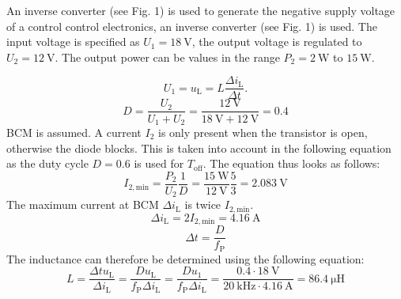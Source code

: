 

An inverse converter (see Fig. 1) is used to generate the negative supply voltage of a control control electronics, an inverse converter (see Fig. 1) is used. The input voltage is specified as $U_\mathrm{1}=\SI{18}{\volt}$, the output voltage is regulated to $U_\mathrm{2}=\SI{12}{\volt}$. The output power can be values in the range $P_\mathrm{2}=\SI{2}{\watt}$ to $\SI{15}{\watt}$.




\begin{solutionblock}
    \begin{equation}
        U_{\mathrm{1}} = u_{\mathrm{L}} = L \frac{\Delta i_{\mathrm{L}} }{\Delta t}. 
    \end{equation}
\begin{equation}
    D = \frac{U_\mathrm{2}}{U_\mathrm{1}+U_\mathrm{2}} = \frac{\SI{12}{\volt}}{\SI{18}{\volt}+\SI{12}{\volt}} = 0.4
\end{equation}
BCM is assumed. A current $I_\mathrm{2}$ is only present when the transistor is open, otherwise the diode blocks. This is taken into account in the following equation as the duty cycle $D = 0.6$ is used for $T_\mathrm{off}$. The equation thus looks as follows:
\begin{equation}
    I_\mathrm{2,min} = \frac{P_\mathrm{2}}{U_\mathrm{2}} \frac{1}{D}=\frac{\SI{15}{\watt}}{\SI{12}{\volt}}\frac{5}{3}=\SI{2.083}{\volt}
\end{equation}
The maximum current at BCM $\Delta i_{\mathrm{L}}$ is twice  $I_\mathrm{2,min}$.
\begin{equation}
    \Delta i_{\mathrm{L}} = 2  I_\mathrm{2,min} = \SI{4.16}{\ampere}
\end{equation}
\begin{equation}
    \Delta t = \frac{D}{f_\mathrm{P}}
\end{equation}
The inductance can therefore be determined using the following equation:
\begin{equation}
    L = \frac{\Delta t  u_{\mathrm{L}}}{\Delta i_{\mathrm{L}}}= \frac{D u_{\mathrm{L}}}{f_\mathrm{P}\Delta i_{\mathrm{L}}}= \frac{D u_{\mathrm{1}}}{f_\mathrm{P}\Delta i_{\mathrm{L}}} = \frac{0.4 \cdot \SI{18}{\volt}}{\SI{20}{\kilo\hertz}\cdot \SI{4.16}{\ampere }} = \SI{86.4}{\micro\henry}
\end{equation}

\end{solutionblock}

